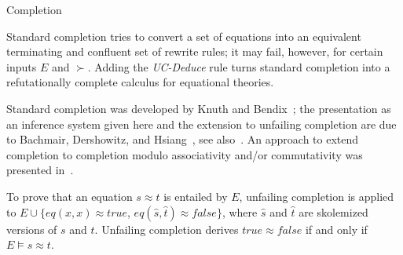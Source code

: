 \begin{entry}{Completion}
\begin{calculus}
\end{calculus}



\begin{clarifications}
Standard completion tries to convert a set of equations into
an equivalent terminating and confluent set of rewrite rules;
it may fail, however, for certain inputs $E$ and $\succ$.
Adding the \textit{UC-Deduce} rule turns standard completion into
a refutationally complete calculus for equational theories.
\end{clarifications}

\begin{history}
Standard completion was developed by Knuth and Bendix~\cite{KnuthBendix1970};
the presentation as an inference system given here
and the extension to unfailing completion
are due to
Bachmair, Dershowitz, and Hsiang~\cite{BachmairDershowitzHsiang1986LICS},
see also~\cite{Bachmair1991}.
An approach to extend completion to completion modulo
associativity and/or commutativity was presented in~\cite{PetersonStickel1981}.

\end{history}

\begin{technicalities}
To prove that an equation $s \approx t$ is entailed by $E$,
unfailing completion is
applied to $E \cup \{\mathit{eq}(x,x) \approx \mathit{true}$,
$\mathit{eq}(\hat{s},\hat{t}) \approx \mathit{false}\}$,
where $\hat{s}$ and $\hat{t}$ are skolemized versions of $s$ and $t$.
Unfailing completion derives $\mathit{true} \approx \mathit{false}$
if and only if $E \models s \approx t$.
\end{technicalities}













\end{entry}
